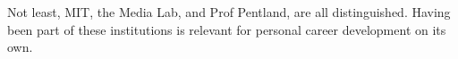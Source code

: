 \documentclass[a4paper, 12pt]{scrartcl}
\begin{document}
Not least, MIT, the Media Lab, and Prof Pentland, are all distinguished. Having been part of these institutions is relevant for personal career development on its own.


\nocite{HubAndSpoke,ecis,bise,energy,datamarket}

\printbibliography[title={Planned Publications},keyword=planned]
\end{document}
